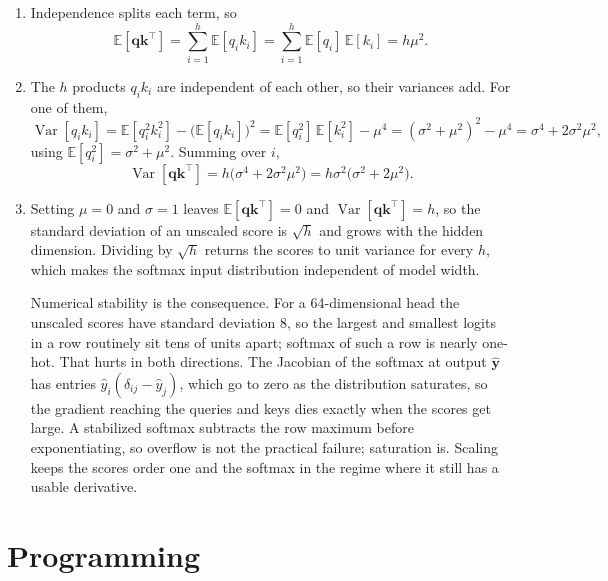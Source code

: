 \documentclass[11pt]{article}
\begin{document}
\begin{enumerate}
  \item Independence splits each term, so
        \[
          \mathbb{E}[\mathbf{q}\mathbf{k}^{\top}] = \sum_{i=1}^{h} \mathbb{E}[q_i k_i]
          = \sum_{i=1}^{h} \mathbb{E}[q_i]\,\mathbb{E}[k_i] = h\mu^2 .
        \]

  \item The $h$ products $q_i k_i$ are independent of each other, so their variances add. For one of them,
        \[
          \operatorname{Var}[q_i k_i] = \mathbb{E}[q_i^2 k_i^2] - \big(\mathbb{E}[q_i k_i]\big)^2
          = \mathbb{E}[q_i^2]\,\mathbb{E}[k_i^2] - \mu^4
          = (\sigma^2 + \mu^2)^2 - \mu^4 = \sigma^4 + 2\sigma^2\mu^2 ,
        \]
        using $\mathbb{E}[q_i^2] = \sigma^2 + \mu^2$. Summing over $i$,
        \[
          \operatorname{Var}[\mathbf{q}\mathbf{k}^{\top}] = h\big(\sigma^4 + 2\sigma^2\mu^2\big)
          = h\sigma^2\big(\sigma^2 + 2\mu^2\big) .
        \]

  \item Setting $\mu = 0$ and $\sigma = 1$ leaves $\mathbb{E}[\mathbf{q}\mathbf{k}^{\top}] = 0$ and
        $\operatorname{Var}[\mathbf{q}\mathbf{k}^{\top}] = h$, so the standard deviation of an unscaled score is
        $\sqrt{h}$ and grows with the hidden dimension. Dividing by $\sqrt{h}$ returns the scores to unit
        variance for every $h$, which makes the softmax input distribution independent of model width.

        Numerical stability is the consequence. For a 64-dimensional head the unscaled scores have standard
        deviation 8, so the largest and smallest logits in a row routinely sit tens of units apart; softmax of
        such a row is nearly one-hot. That hurts in both directions. The Jacobian of the softmax at output
        $\hat{\mathbf{y}}$ has entries $\hat{y}_i(\delta_{ij} - \hat{y}_j)$, which go to zero as the
        distribution saturates, so the gradient reaching the queries and keys dies exactly when the scores get
        large. A stabilized softmax subtracts the row maximum before exponentiating, so overflow is not the
        practical failure; saturation is. Scaling keeps the scores order one and the softmax in the
        regime where it still has a usable derivative.
\end{enumerate}

\section{Programming}
\end{document}
